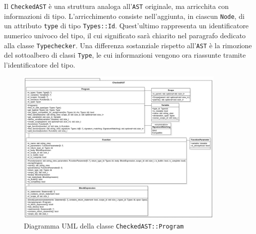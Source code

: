 Il \texttt{CheckedAST} \`e una struttura analoga all'\texttt{AST} originale, ma arricchita con informazioni di tipo. L'arricchimento consiste nell'aggiunta, in ciascun \texttt{Node}, di un attributo \texttt{type} di tipo \texttt{Types::Id}. Quest'ultimo rappresenta un identificatore numerico univoco del tipo, il cui significato sarà chiarito nel paragrafo dedicato alla classe \texttt{Typechecker}. Una differenza sostanziale rispetto all'\texttt{AST} è la rimozione del sottoalbero di classi \texttt{Type}, le cui informazioni vengono ora riassunte tramite l'identificatore del tipo.

\begin{figure}[H]
	\centering
	\includegraphics[width=0.9\textwidth]{figures/checked_ast_program.png}
	\caption{Diagramma UML della classe \texttt{CheckedAST::Program}}
	\label{fig:checked-ast-program-uml}
\end{figure}

